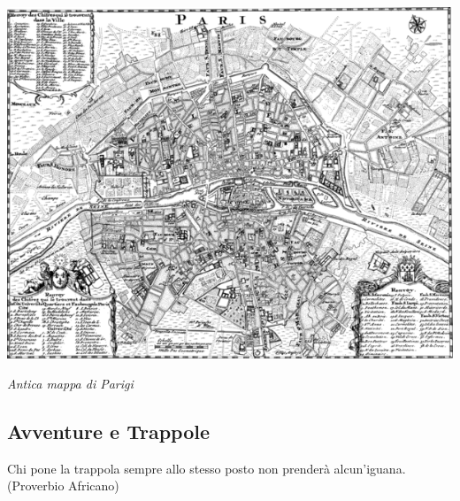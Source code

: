 \begin{center}
\includegraphics[width=0.9\linewidth]{immagini/mappaparigi.png}

\emph{Antica mappa di Parigi}
\end{center}

\pagebreak

\subsection{Avventure e Trappole}\label{trappole}


\begin{changemargin}{0.3cm}{0.3cm}\begin{enfasi}{
Chi pone la trappola sempre allo stesso posto non prenderà alcun'iguana. (Proverbio Africano)}\end{enfasi}\end{changemargin}\medskip



